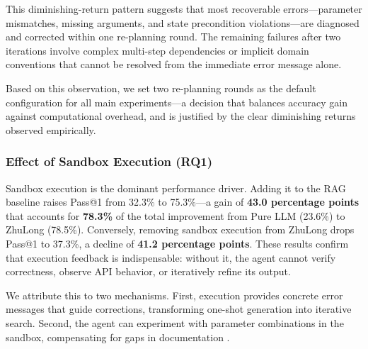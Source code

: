 \documentclass[anonymous, sigconf]{acmart}
\begin{document}
This diminishing-return pattern suggests that most recoverable errors—parameter mismatches, missing arguments, and state precondition violations—are diagnosed and corrected within one re-planning round. The remaining failures after two iterations involve complex multi-step dependencies or implicit domain conventions that cannot be resolved from the immediate error message alone.

Based on this observation, we set two re-planning rounds as the default 
configuration for all main experiments—a decision that balances accuracy 
gain against computational overhead, and is justified by the clear 
diminishing returns observed empirically.

\subsubsection{Effect of Sandbox Execution (RQ1)}

Sandbox execution is the dominant performance driver. Adding it to the RAG baseline raises Pass@1 from 32.3\% to 75.3\%---a gain of \textbf{43.0 percentage points} that accounts for \textbf{78.3\%} of the total improvement from Pure LLM (23.6\%) to ZhuLong (78.5\%). Conversely, removing sandbox execution from ZhuLong drops Pass@1 to 37.3\%, a decline of \textbf{41.2 percentage points}. These results confirm that execution feedback is indispensable: without it, the agent cannot verify correctness, observe API behavior, or iteratively refine its output.

We attribute this to two mechanisms. First, execution provides concrete error messages that guide corrections, transforming one-shot generation into iterative search. Second, the agent can experiment with parameter combinations in the sandbox, compensating for gaps in documentation \cite{kumar2026agentforge, jiang2024seed}.
\end{document}
